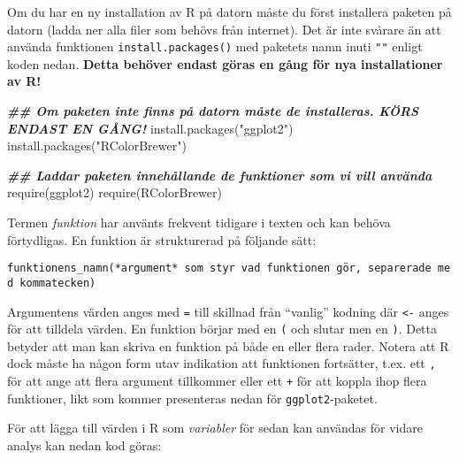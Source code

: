 \documentclass[
]{book}
\newenvironment{Shaded}{\begin{snugshade}}{\end{snugshade}}
\newcommand{\DocumentationTok}[1]{\textcolor[rgb]{0.56,0.35,0.01}{\textbf{\textit{#1}}}}
\newcommand{\FunctionTok}[1]{\textcolor[rgb]{0.00,0.00,0.00}{#1}}
\newcommand{\NormalTok}[1]{#1}
\newcommand{\StringTok}[1]{\textcolor[rgb]{0.31,0.60,0.02}{#1}}
\theoremstyle{definition}
\theoremstyle{definition}
\theoremstyle{definition}
\theoremstyle{definition}
\theoremstyle{remark}
\begin{document}
Om du har en ny installation av R på datorn måste du först installera paketen på datorn (ladda ner alla filer som behövs från internet). Det är inte svårare än att använda funktionen \texttt{install.packages()} med paketets namn inuti \texttt{""} enligt koden nedan. \textbf{Detta behöver endast göras en gång för nya installationer av R!}

\begin{Shaded}
\begin{Highlighting}[]
\DocumentationTok{\#\# Om paketen inte finns på datorn måste de installeras. KÖRS ENDAST EN GÅNG!}
\FunctionTok{install.packages}\NormalTok{(}\StringTok{"ggplot2"}\NormalTok{)}
\FunctionTok{install.packages}\NormalTok{(}\StringTok{"RColorBrewer"}\NormalTok{)}

\DocumentationTok{\#\# Laddar paketen innehållande de funktioner som vi vill använda}
\FunctionTok{require}\NormalTok{(ggplot2)}
\FunctionTok{require}\NormalTok{(RColorBrewer)}
\end{Highlighting}
\end{Shaded}

Termen \emph{funktion} har använts frekvent tidigare i texten och kan behöva förtydligas. En funktion är strukturerad på följande sätt:
\newline

\texttt{funktionens\_namn(*argument*\ som\ styr\ vad\ funktionen\ gör,\ separerade\ med\ kommatecken)}

\newline

Argumentens värden anges med \texttt{=} till skillnad från ``vanlig'' kodning där \texttt{\textless{}-} anges för att tilldela värden. En funktion börjar med en \texttt{(} och slutar men en \texttt{)}. Detta betyder att man kan skriva en funktion på både en eller flera rader. Notera att R dock måste ha någon form utav indikation att funktionen fortsätter, t.ex. ett \texttt{,} för att ange att flera argument tillkommer eller ett \texttt{+} för att koppla ihop flera funktioner, likt som kommer presenteras nedan för \texttt{ggplot2}-paketet.

För att lägga till värden i R som \emph{variabler} för sedan kan användas för vidare analys kan nedan kod göras:
\end{document}
